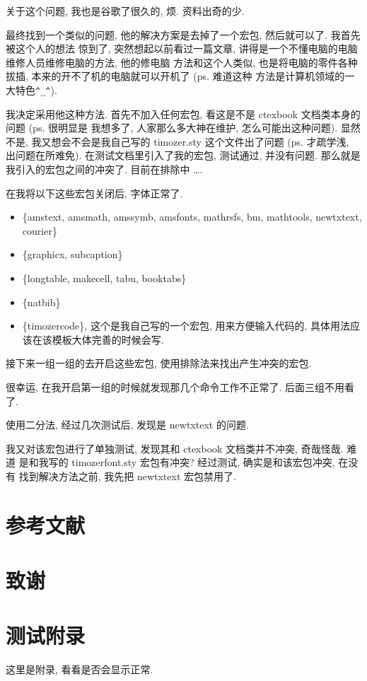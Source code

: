 \documentclass{cugrep}
\begin{document}
关于这个问题, 我也是谷歌了很久的, 烦. 资料出奇的少.

最终找到一个类似的问题, 他的解决方案是去掉了一个宏包, 然后就可以了. 我首先被这个人的想法
惊到了, 突然想起以前看过一篇文章, 讲得是一个不懂电脑的电脑维修人员维修电脑的方法, 他的修电脑
方法和这个人类似, 也是将电脑的零件各种拔插, 本来的开不了机的电脑就可以开机了 (ps. 难道这种
方法是计算机领域的一大特色\verb|^_^|).

我决定采用他这种方法. 首先不加入任何宏包, 看这是不是 ctexbook 文档类本身的问题 (ps. 很明显是
我想多了, 人家那么多大神在维护, 怎么可能出这种问题). 显然不是, 我又想会不会是我自己写的 
timozer.sty 这个文件出了问题 (ps. 才疏学浅, 出问题在所难免). 在测试文档里引入了我的宏包, 
测试通过, 并没有问题. 那么就是我引入的宏包之间的冲突了. 目前在排除中 \ldots .

在我将以下这些宏包关闭后, 字体正常了.

\begin{itemize}
    \item \{amstext, amsmath, amssymb, amsfonts, mathrsfs, bm, mathtools, newtxtext, courier\}
    \item \{graphicx, subcaption\}
    \item \{longtable, makecell, tabu, booktabs\}
    \item \{natbib\}
    \item \{timozercode\}, 这个是我自己写的一个宏包, 用来方便输入代码的, 具体用法应该在该模板大体完善的时候会写.
\end{itemize}


接下来一组一组的去开启这些宏包, 使用排除法来找出产生冲突的宏包. 

很幸运, 在我开启第一组的时候就发现那几个命令工作不正常了. 后面三组不用看了.

使用二分法, 经过几次测试后, 发现是 newtxtext 的问题. 

我又对该宏包进行了单独测试, 发现其和 ctexbook 文档类并不冲突, 奇哉怪哉. 难道
是和我写的 timozerfont.sty 宏包有冲突? 经过测试, 确实是和该宏包冲突, 在没有
找到解决方法之前, 我先把 newtxtext 宏包禁用了. 
\backmatter
\chapter{参考文献}
\chapter{致谢}
\appendix
\chapter{测试附录}
这里是附录, 看看是否会显示正常.

\backmatter 
\end{document}
